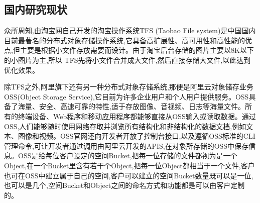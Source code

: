 \subsection{国内研究现状}




众所周知,由淘宝网自己开发的淘宝操作系统TFS (Taobao File system)是中国国内目前最著名的分布式对象存储操作系统,它具备高扩展性、高可用性和高性能的优点,但主要是根据小文件存放需要而设计。由于淘宝后台存储的图片主要以8K以下的小图片为主,所以 TFS先将小文件合并成大文件,然后直接存储大文件,以此达到优化效果。

除TFS之外,阿里旗下还有另一种分布式对象存储系统,那便是阿里云对象储存业务OSS(Object Storage Service),它目前为许多企业用户和个人用户提供服务。OSS具备了海量、安全、高速可靠的特性,适于存放图像、音视频、日志等海量文件。所有的终端设备、Web程序和移动应用程序都能够直接从OSS输入或读取数据。通过OSS,人们能够随时使用网络存取并浏览所有结构化和非结构化的数据文档,例如文本、图像和视频。OSS官网还向开发者开放了控制台接口,以及遵循OSS标准的CLI管理命令,可让开发者通过调用由阿里云开发的APIS,在对象所存储的OSS中保存信息。OSS是给每位客户设定的空间Bucket,把每一位存储的文件都视为是一个Object,在一个Bucket里含有若干个Object,把每一位Object都相当于一个文件,客户也可在OSS中建立属于自己的空间,客户可以建立的空间Bucket数量既可以是一位,也可以是几个,空间Bucket和Object之间的命名方式和功能都是可以由客户定制的。

